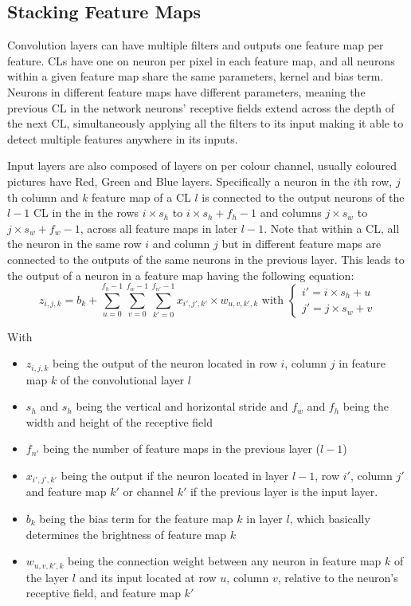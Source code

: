\documentclass[12pt letter]{report}
\begin{document}
\subsection{Stacking Feature Maps}\label{stacking-feature-maps}

Convolution layers can have multiple filters and outputs one feature map
per feature. CLs have one on neuron per pixel in each feature map, and
all neurons within a given feature map share the same parameters, kernel
and bias term. Neurons in different feature maps have different
parameters, meaning the previous CL in the network neurons' receptive
fields extend across the depth of the next CL, simultaneously applying
all the filters to its input making it able to detect multiple features
anywhere in its inputs.

Input layers are also composed of layers on per colour channel, usually
coloured pictures have Red, Green and Blue layers. Specifically a neuron
in the \(i\)th row, \(j\)th column and \(k\) feature map of a CL \(l\)
is connected to the output neurons of the \(l-1\) CL in the in the rows
\(i \times s_h\) to \(i \times s_h + f_h - 1\) and columns
\(j \times s_w\) to \(j \times s_w + f_w - 1\), across all feature maps
in later \(l-1\). Note that within a CL, all the neuron in the same row
\(i\) and column \(j\) but in different feature maps are connected to
the outputs of the same neurons in the previous layer. This leads to the
output of a neuron in a feature map having the following equation: \[
z_{i,j,k} = b_k + \displaystyle\sum_{u = 0}^{f_h - 1} \displaystyle\sum_{v = 0}^{f_w - 1} \displaystyle\sum_{k' = 0}^{f_{n'} - 1} x_{i', j', k'} \times w_{u, v, k', k} \text{ with } \begin{cases}
i' = i \times s_h + u \\
j' = j \times s_w + v
\end{cases}
\]

With

\begin{itemize}
\item
  \(z_{i, j, k}\) being the output of the neuron located in row \(i\),
  column \(j\) in feature map \(k\) of the convolutional layer \(l\)
\item
  \(s_h\) and \(s_h\) being the vertical and horizontal stride and
  \(f_w\) and \(f_h\) being the width and height of the receptive field
\item
  \(f_{n'}\) being the number of feature maps in the previous layer
  (\(l - 1\))
\item
  \(x_{i', j', k'}\) being the output if the neuron located in layer
  \(l-1\), row \(i'\), column \(j'\) and feature map \(k'\) or channel
  \(k'\) if the previous layer is the input layer.
\item
  \(b_k\) being the bias term for the feature map \(k\) in layer \(l\),
  which basically determines the brightness of feature map \(k\)
\item
  \(w_{u, v, k', k}\) being the connection weight between any neuron in
  feature map \(k\) of the layer \(l\) and its input located at row
  \(u\), column \(v\), relative to the neuron's receptive field, and
  feature map \(k'\)
\end{itemize}
\end{document}
